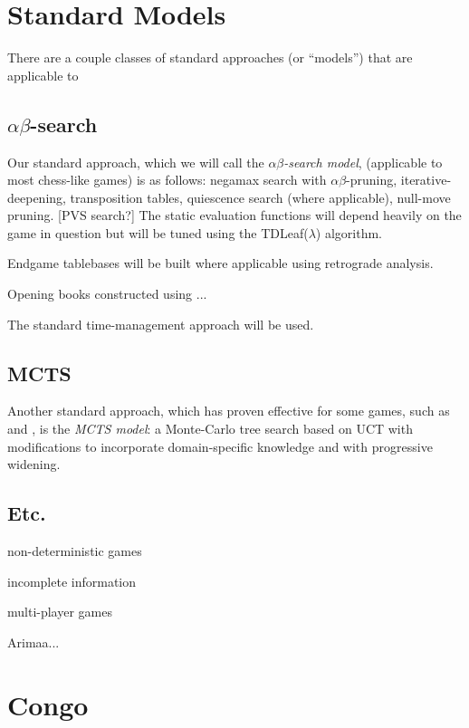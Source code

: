 \documentclass[10pt,dvipdfmx]{report}
\newcommand{\ab}{{$\alpha\beta$}}
\newcommand{\g}[1]{{\sc{#1}}\index{{\sc{#1}}}}
\begin{document}
\chapter{Standard Models}
\label{chap-standard-models}

There are a couple classes of standard approaches (or ``models'') that
are applicable to 


\section{\ab-search}

Our standard approach, which we will call the {\em \ab-search model},
(applicable to most chess-like games) is as follows: negamax search with \ab-pruning, iterative-deepening,
transposition tables, quiescence search (where applicable), null-move pruning. [PVS search?]
The static evaluation functions will depend heavily on the game in question but will be
tuned using the TDLeaf($\lambda$) algorithm.

Endgame tablebases will be built where applicable using retrograde analysis.

Opening books constructed using ...

The standard time-management approach will be used.


\section{MCTS}

Another standard approach, which has proven effective for some games, such as \g{go} and \g{hex},
is the {\em MCTS model}: a Monte-Carlo tree search based on UCT with modifications to incorporate
domain-specific knowledge and with progressive widening.

\section{Etc.}

non-deterministic games

incomplete information

multi-player games

Arimaa...


\chapter{Congo}
\label{chap-congo}
\end{document}
